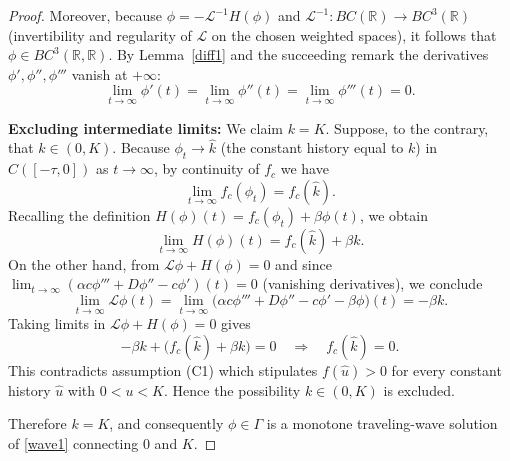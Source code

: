 \documentclass[12pt,letterpaper]{amsart}
\theoremstyle{definition}
\theoremstyle{remark}
\numberwithin{equation}{section}
\begin{document}
\begin{proof}
	Moreover, because \(\phi= -\mathcal L^{-1}H(\phi)\) and \(\mathcal L^{-1}:BC(\mathbb R)\to BC^3(\mathbb R)\) (invertibility and regularity of \(\mathcal L\) on the chosen weighted spaces), it follows that \(\phi\in BC^3(\mathbb R,\mathbb R)\). By Lemma~\ref{diff1} and the succeeding remark the derivatives \(\phi',\phi'',\phi'''\) vanish at \(+\infty\):
	\[
	\lim_{t\to\infty}\phi'(t)=\lim_{t\to\infty}\phi''(t)=\lim_{t\to\infty}\phi'''(t)=0.
	\]
	
	\medskip\noindent\textbf{ Excluding intermediate limits:}
	We claim \(k=K\). Suppose, to the contrary, that \(k\in(0,K)\). 
	Because \(\phi_t\to\widehat{k}\) (the constant history equal to \(k\)) in \(C([-\tau,0])\) as \(t\to\infty\), by continuity of \(f_c\) we have
	\[
	\lim_{t\to\infty} f_c(\phi_t) = f_c(\widehat{k}).
	\]
	Recalling the definition \(H(\phi)(t)=f_c(\phi_t)+\beta\phi(t)\), we obtain
	\[
	\lim_{t\to\infty} H(\phi)(t) = f_c(\widehat{k}) + \beta k.
	\]
	On the other hand, from \(\mathcal L\phi + H(\phi)=0\) and since
	\(\lim_{t\to\infty}(\alpha c\phi''' + D\phi'' - c\phi')(t)=0\) (vanishing derivatives), we conclude
	\[
	\lim_{t\to\infty}\mathcal L\phi(t) = \lim_{t\to\infty}\big(\alpha c\phi''' + D\phi'' - c\phi' - \beta\phi\big)(t)
	= -\beta k.
	\]
	Taking limits in \(\mathcal L\phi + H(\phi)=0\) gives
	\[
	-\beta k + \bigl(f_c(\widehat{k}) + \beta k\bigr) = 0 \quad\Longrightarrow\quad f_c(\widehat{k}) = 0.
	\]
	This contradicts assumption (C1) which stipulates \(f(\widehat{u})>0\) for every constant history \(\widehat{u}\) with \(0<u<K\). Hence the possibility \(k\in(0,K)\) is excluded.
	
	Therefore \(k=K\), and consequently \(\phi\in\Gamma\) is a monotone traveling-wave solution of \eqref{wave1} connecting \(0\) and \(K\).
\end{proof}
\end{document}
